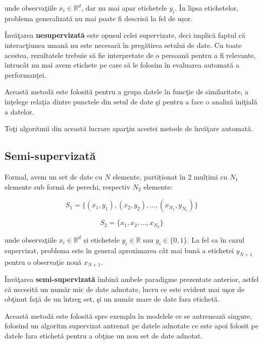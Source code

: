 unde observaţiile $x_{i} \in \mathbb{R} ^ d$, dar nu mai apar etichetele
$y_{i}$.
În lipsa etichetelor, problema generalizată nu mai poate fi descrisă la fel 
de ușor.

Învăţarea \textbf{nesupervizată} este opusul celei supervizate, deci implică faptul 
că interacţiunea umană nu este necesară în pregătirea setului de date. Cu toate 
acestea, rezultatele trebuie să fie interpretate de o persoană pentru a fi relevante,
întrucât nu mai avem etichete pe care să le folosim în evaluarea automată a 
performanţei.

Această metodă este folosită pentru a grupa datele în funcţie de similaritate,
a înţelege relaţia dintre punctele din setul de date şi pentru a face o analiză 
iniţială a datelor.

Toţi algoritmii din această lucrare aparţin acestei metode de învăţare automată.

\subsection{Semi-supervizată}

Formal, avem un set de date cu $N$ elemente, partiționat în 2 mulțimi cu $N_{1}$ elemente sub formă de perechi, 
respectiv $N_{2}$ elemente:

\begin{equation}
    S_{1} = \{(x_{1}, y_{1}), (x_{2}, y_{2}), \dots, (x_{N_{1}}, y_{N_{1}})\}
\end{equation}

\begin{equation}
    S_{2} = \{x_{1}, x_{2}, \dots, x_{N_{2}}\}
\end{equation}

unde observaţiile $x_{i} \in \mathbb{R} ^ d$ și etichetele 
$y_{i} \in \mathbb{R}$ sau $y_{i} \in \{0, 1\}$. 
La fel ca în cazul supervizat, problema este în general
aproximarea cât mai bună a etichetei $y_{N + 1}$ pentru o observaţie nouă 
$x_{N + 1}$.

Învăţarea  \textbf{semi-supervizată} 
îmbină ambele paradigme prezentate anterior, astfel
că necesită un număr mic de date adnotate, lucru ce este evident mai uşor de 
obţinut faţă de un întreg set, şi un număr mare de date fara etichetă.

Această metodă este folosită spre exemplu în modelele ce se antrenează singure, 
folosind un algoritm supervizat antrenat pe datele adnotate ce este apoi 
folosit pe datele fara etichetă pentru a obţine un nou set de date adnotat.

